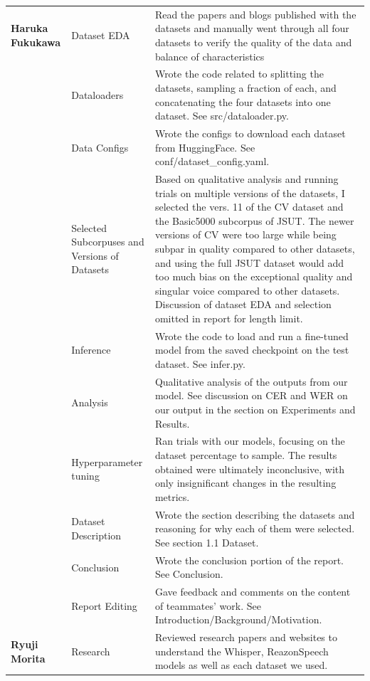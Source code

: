 \documentclass[10pt,twocolumn,letterpaper]{article}
\begin{document}
\begin{table}
\begin{tabular}{|p{2cm}|p{2.9cm}|p{13cm}|}
\hline
\textbf{Haruka Fukukawa} & Dataset EDA & Read the papers and blogs published with the datasets and manually went through all four datasets to verify the quality of the data and balance of characteristics \\
\cline{2-3}
                 & Dataloaders & Wrote the code related to splitting the datasets, sampling a fraction of each, and concatenating the four datasets into one dataset. See src/dataloader.py. \\
\cline{2-3}
                 & Data Configs & Wrote the configs to download each dataset from HuggingFace. See conf/dataset\_config.yaml. \\
\cline{2-3}
                 & Selected Subcorpuses and Versions of Datasets & Based on qualitative analysis and running trials on multiple versions of the datasets, I selected the vers. 11 of the CV dataset and the Basic5000 subcorpus of JSUT. The newer versions of CV were too large while being subpar in quality compared to other datasets, and using the full JSUT dataset would add too much bias on the exceptional quality and singular voice compared to other datasets. Discussion of dataset EDA and selection omitted in report for length limit. \\
\cline{2-3}
                 & Inference & Wrote the code to load and run a fine-tuned model from the saved checkpoint on the test dataset. See infer.py.  \\
\cline{2-3}
                 & Analysis & Qualitative analysis of the outputs from our model. See discussion on CER and WER on our output in the section on Experiments and Results.  \\
\cline{2-3}
                 & Hyperparameter tuning & Ran trials with our models, focusing on the dataset percentage to sample. The results obtained were ultimately inconclusive, with only insignificant changes in the resulting metrics.  \\
\cline{2-3}
                 & Dataset Description & Wrote the section describing the datasets and reasoning for why each of them were selected. See section 1.1 Dataset.  \\
\cline{2-3}
                 & Conclusion & Wrote the conclusion portion of the report. See Conclusion.  \\
\cline{2-3}
                 & Report Editing & Gave feedback and comments on the content of teammates' work. See Introduction/Background/Motivation.  \\
\hline
\textbf{Ryuji Morita} & Research & Reviewed research papers and websites to understand the Whisper, ReazonSpeech models as well as each dataset we used.

\end{tabular}
\end{table}
\end{document}
